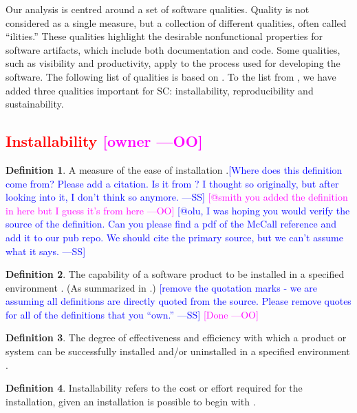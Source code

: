 \documentclass[letterpaper,cleveref]{lipics-v2019}
\newcommand{\authornote}[3]{\textcolor{#1}{[#3 ---#2]}}
\newcommand{\authornote}[3]{}
\newcommand{\wss}[1]{\authornote{blue}{SS}{#1}} %
\newcommand{\oo}[1]{\authornote{magenta}{OO}{#1}} %
\newcommand{\notdone}[1]{\textcolor{red}{#1}}
\theoremstyle{definition}
\newtheorem{defn}{Definition}
\begin{document}
Our analysis is centred around a set of software qualities.  Quality is not
considered as a single measure, but a collection of different qualities, often
called ``ilities.''  These qualities highlight the desirable nonfunctional
properties for software artifacts, which include both documentation and
code. Some qualities, such as visibility and productivity, apply to the process
used for developing the software. The following list of qualities is based on
\cite{GhezziEtAl2003}. To the list from \cite{GhezziEtAl2003}, we have added
three qualities important for SC: installability, reproducibility and
sustainability.

\subsection{\notdone{Installability} \oo{owner}}

\begin{defn}
  A measure of the ease of installation \citep{smith2015comparing}.\wss{Where
    does this definition come from? Please add a citation.  Is it from
    \citet{McCallEtAl1977}? I thought so originally, but after looking into it,
    I don't think so anymore.}  \oo{@smith you added the definition in here but
    I guess it's from here} \wss{@olu, I was hoping you would verify the source
    of the definition.  Can you please find a pdf of the McCall reference and
    add it to our pub repo.  We should cite the primary source,
    but we can't assume what it says.}
\end{defn}

\begin{defn}
  The capability of a software product to be installed in a specified
  environment \citep{iso2001iec}. (As summarized in
  \citep{berander2005software}.)  \wss{remove the quotation marks - we are
    assuming all definitions are directly quoted from the source. Please remove
    quotes for all of the definitions that you ``own.''}  \oo{Done}
\end{defn}

\begin{defn} \label{Installability_Selected2}
	The degree of effectiveness and efficiency with which a product or system can
	be successfully installed and/or uninstalled in a specified environment
	\citep{ISO/IEC25010}.
\end{defn}

\begin{defn} \label{Installability_Selected1} Installability refers to the cost
  or effort required for the installation, given an installation is possible to
  begin with \citep{lenhard2013measuring}.
\end{defn}
\end{document}
